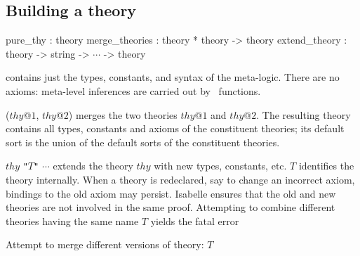 \subsection{Building a theory}
\label{BuildingATheory}
\begin{ttbox} 
pure_thy       : theory
merge_theories : theory * theory -> theory
extend_theory  : theory -> string -> \(\cdots\) -> theory
\end{ttbox}
\begin{ttdescription}
\item[\ttindexbold{pure_thy}] contains just the types, constants, and syntax
  of the meta-logic.  There are no axioms: meta-level inferences are carried
  out by \ML\ functions.
\item[\ttindexbold{merge_theories} ($thy@1$, $thy@2$)] merges the two
  theories $thy@1$ and $thy@2$.  The resulting theory contains all types,
  constants and axioms of the constituent theories; its default sort is the
  union of the default sorts of the constituent theories.
\item [\ttindexbold{extend_theory} $thy$ {\tt"}$T${\tt"} $\cdots$] extends
  the theory $thy$ with new types, constants, etc.  $T$ identifies the theory
  internally.  When a theory is redeclared, say to change an incorrect axiom,
  bindings to the old axiom may persist.  Isabelle ensures that the old and
  new theories are not involved in the same proof.  Attempting to combine
  different theories having the same name $T$ yields the fatal error
\begin{ttbox}
Attempt to merge different versions of theory: \(T\)
\end{ttbox}
\end{ttdescription}



